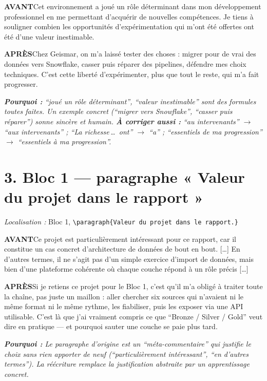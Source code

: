 \documentclass[11pt,a4paper]{article}
\newcommand{\av}{\textbf{\textcolor{avant}{AVANT}}\quad}
\newcommand{\ap}{\textbf{\textcolor{apres}{APRÈS}}\quad}
\newcommand{\pourquoi}[1]{\par\smallskip\noindent\textit{\textbf{Pourquoi :} #1}\par\smallskip}
\begin{document}
\begin{avantbox}
\av Cet environnement a joué un rôle déterminant dans mon développement professionnel en me
permettant d'acquérir de nouvelles compétences. Je tiens à souligner combien les
opportunités d'expérimentation qui m'ont été offertes ont été d'une valeur inestimable.
\end{avantbox}
\begin{apresbox}
\ap Chez Geismar, on m'a laissé tester des choses : migrer pour de vrai des données vers
Snowflake, casser puis réparer des pipelines, défendre mes choix techniques. C'est cette
liberté d'expérimenter, plus que tout le reste, qui m'a fait progresser.
\end{apresbox}
\pourquoi{\enquote{joué un rôle déterminant}, \enquote{valeur inestimable} sont des
formules toutes faites. Un exemple concret (\enquote{migrer vers Snowflake},
\enquote{casser puis réparer}) sonne sincère et humain. \textbf{À corriger aussi :}
\enquote{au intervenants} $\rightarrow$ \enquote{aux intervenants} ;
\enquote{La richesse\,\dots\ ont} $\rightarrow$ \enquote{a} ; \enquote{essentiels de ma
progression} $\rightarrow$ \enquote{essentiels à ma progression}.}

\section*{3. Bloc 1 --- paragraphe « Valeur du projet dans le rapport »}
\noindent\textit{Localisation :} Bloc 1, \texttt{\textbackslash paragraph\{Valeur du projet dans le rapport.\}}

\begin{avantbox}
\av Ce projet est particulièrement intéressant pour ce rapport, car il constitue un cas
concret d'architecture de données de bout en bout. [\dots] En d'autres termes, il ne s'agit
pas d'un simple exercice d'import de données, mais bien d'une plateforme cohérente où chaque
couche répond à un rôle précis [\dots]
\end{avantbox}
\begin{apresbox}
\ap Si je retiens ce projet pour le Bloc 1, c'est qu'il m'a obligé à traiter toute la
chaîne, pas juste un maillon : aller chercher six sources qui n'avaient ni le même format
ni le même rythme, les fiabiliser, puis les exposer via une API utilisable. C'est là que
j'ai vraiment compris ce que \enquote{Bronze / Silver / Gold} veut dire en pratique --- et
pourquoi sauter une couche se paie plus tard.
\end{apresbox}
\pourquoi{Le paragraphe d'origine est un \enquote{méta-commentaire} qui justifie le choix
sans rien apporter de neuf (\enquote{particulièrement intéressant}, \enquote{en d'autres
termes}). La réécriture remplace la justification abstraite par un apprentissage concret.}
\end{document}

